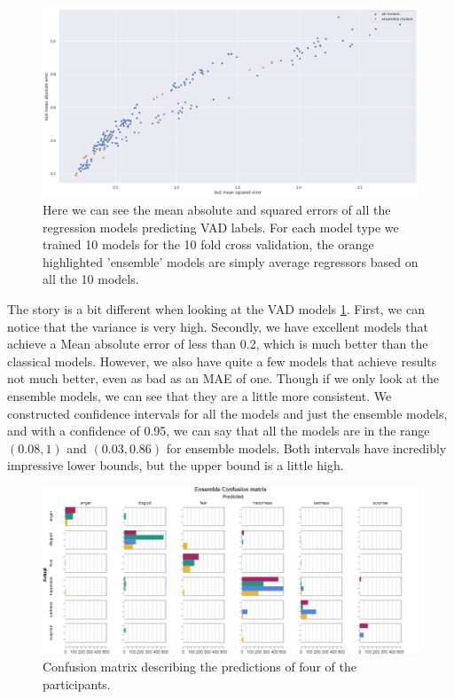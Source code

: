 \documentclass[../main.tex]{subfiles}
\begin{document}
    \begin{figure}[!htp]
        \centering
        \includegraphics[width=14cm]{figures/results/nn_err}   
        \caption{Here we can see the mean absolute and squared errors of all the regression models predicting VAD labels. For each model type we trained 10 models for 
        the 10 fold cross validation, the orange highlighted 'ensemble' models are simply average regressors based on all the 10 models.}
        \label{fig:nn_err} 
    \end{figure}


    The story is a bit different when looking at the VAD models \ref{fig:nn_err}. First, we can notice that the variance is very high. 
    Secondly, we have excellent models that achieve a Mean absolute error of less than 0.2, which is much better than the classical models. However, 
    we also have quite a few models that achieve results not much better, even as bad as an MAE of one. Though if we only look at the ensemble models, 
    we can see that they are a little more consistent. We constructed confidence intervals for all the models and just the ensemble models, 
    and with a confidence of 0.95, we can say that all the models are in the range $(0.08, 1)$ and $(0.03, 0.86)$ for ensemble models. Both intervals 
    have incredibly impressive lower bounds, but the upper bound is a little high. 

    \begin{figure}[!htp]
        \centering
        \includegraphics[width=14cm]{figures/results/nn_ensemble_cm}   
        \caption{Confusion matrix describing the predictions of four of the participants.}
        \label{fig:nn_ensemble_cm} 
    \end{figure}
\end{document}
